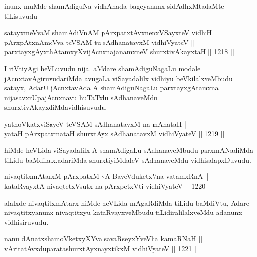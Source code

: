 \begin{center}
inunx muMde shamAdiguNa vidhAnada bageyanunx sidAdhxMtadaMte tiLisuvudu
\end{center}


\begin{shl}
satayxmeVvaM shamAdiVnAM pArxpatxtAvxnenxVSayxteV vidhiH || \\
pArxpAtxnAmeVva teVSAM tu sAdhanatavxM vidhiVyateV || \\
parxtayxgAyxthAtamxyXvijAcnxnajanamxneV shurxtivAkayxtaH \hfill || 1218 ||  
\end{shl}

\begin{artha}
I riVtiyAgi heVLuvudu nija. aMdare shamAdiguNagaLu modale jAcnxtavAgiruvudariMda avugaLa viSayadalilx vidhiyu beVkilalxveMbudu satayx, AdarU jAcnxtavAda A shamAdiguNagaLu parxtayxgAtamxna nijasavxrUpajAcnxnavu huTaTxlu sAdhanaveMdu shurxtivAkayxdiMda\break vidhisuvudu.
\end{artha}


\begin{shl}
yathoVkatxviSayeV teVSAM sAdhanatavxM na mAnataH || \\
yataH pArxpatxmataH shurxtAyx sAdhanatavxM vidhiVyateV \hfill || 1219 ||  
\end{shl}

\begin{artha}
hiMde heVLida viSayadalilx A shamAdigaLu sAdhanaveMbudu parxmANadiMda tiLidu baMdilalx.adariMda shurxtiyiMdaleV sAdhanaveMdu vidhisalapxDuvudu.
\end{artha}

\begin{shl}
nivaqtitxmAtarxM pArxpatxM vA BaveVduketxVna vatamxRnA || \\
kataRvayxtA nivaqtetxVsutx na pArxpetxVti vidhiVyateV \hfill || 1220 ||  
\end{shl}

\begin{artha}
alalxde nivaqtitxmAtarx hiMde heVLida mAgaRdiMda tiLidu baMdiVtu, Adare nivaqtitxyanunx nivaqtitxyu kataRvayxveMbudu tiLidiralilalxveMdu adanunx vidhisiruvudu.
\end{artha}


\begin{shl}
nanu dAnatxshamoVketxyXYva savaRseyxYveVha kamaRNaH || \\
vAritatAvxduparatashurxtAyx\s nayxtikxM vidhiVyateV \hfill || 1221 ||  
\end{shl}

